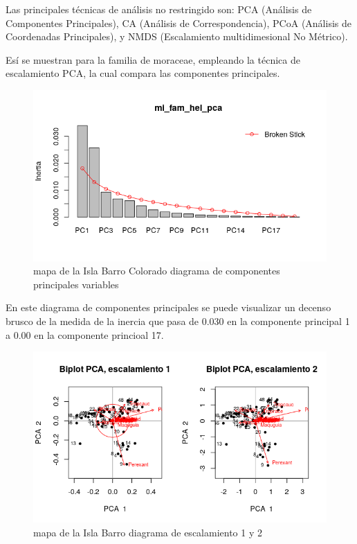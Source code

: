 \documentclass[11pt,]{article}
\begin{document}
Las principales técnicas de análisis no restringido son: PCA (Análisis
de Componentes Principales), CA (Análisis de Correspondencia), PCoA
(Análisis de Coordenadas Principales), y NMDS (Escalamiento
multidimesional No Métrico).

Esí se muestran para la familia de moraceae, empleando la técnica de
escalamiento PCA, la cual compara las componentes principales.

\begin{figure}
\centering
\includegraphics[width=1.00000\textwidth]{mi_fam_hel_pca.png}
\caption{mapa de la Isla Barro Colorado diagrama de componentes
principales variables\label{fig:bci_map}}
\end{figure}

En este diagrama de componentes principales se puede visualizar un
decenso brusco de la medida de la inercia que pasa de 0.030 en la
componente principal 1 a 0.00 en la componente princioal 17.

\begin{figure}
\centering
\includegraphics[width=1.00000\textwidth]{escalamiento_1_2.png}
\caption{mapa de la Isla Barro diagrama de escalamiento 1 y 2
\label{fig:bci_map}}
\end{figure}
\end{document}
